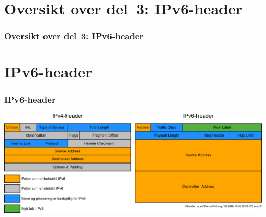 \begin{frame}
  \partpage
\end{frame}

\section*{Oversikt over del~3: IPv6-header}
\begin{frame}[allowframebreaks]
  \frametitle{Oversikt over del~3: IPv6-header}
    \tableofcontents%
\end{frame}

\section{IPv6-header}
\begin{frame}%
  \frametitle{IPv6-header}
  \begin{center}
      {\includegraphics[scale=.2274]{IPv4-vs-IPv6.pdf}}
  \end{center}
\end{frame}

